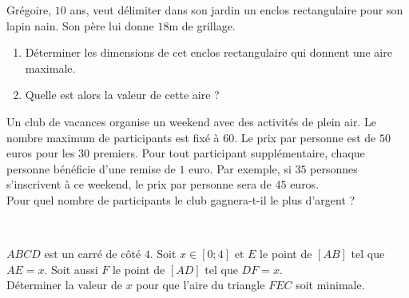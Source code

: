 \documentclass[11pt]{article}
\begin{document}
\begin{exo}[$\star\star$]
  Grégoire, $10$ ans, veut délimiter dans son jardin un
enclos rectangulaire pour son lapin nain. Son père lui donne $18$m de grillage.
\begin{enumerate}
  \item Déterminer les dimensions de cet enclos rectangulaire qui donnent une
    aire maximale.
  \item Quelle est alors la valeur de cette aire ?
\end{enumerate}
\end{exo}

\begin{exo}[$\star\star$]
  Un club de vacances organise un weekend avec des
activités de plein air. Le nombre maximum de participants est fixé à $60$. Le
prix par personne est de $50$ euros pour les $30$ premiers. Pour tout participant
supplémentaire, chaque personne bénéficie d'une remise de $1$ euro. Par exemple, si
$35$ personnes s'inscrivent à ce weekend, le prix par personne sera de $45$
euros.\\
Pour quel nombre de participants le club gagnera-t-il le plus d'argent ?
\end{exo}

\begin{exo}[$\star\star$]~\\[-16mm]
  \begin{minipage}{.7\textwidth}
  $ABCD$ est un carré de côté $4$. Soit $x\in\left[ 0; 4 \right]$ et $E$ le
  point de $\left[ AB \right]$ tel que $AE=x$. Soit aussi $F$ le point de
  $\left[ AD \right]$ tel que $DF=x$.\\
  Déterminer la valeur de $x$ pour que l'aire du triangle $FEC$ soit minimale.
\end{minipage}
\begin{minipage}{.3\textwidth}
\begin{center}
\end{center}
\end{minipage}
\end{exo}
\end{document}

